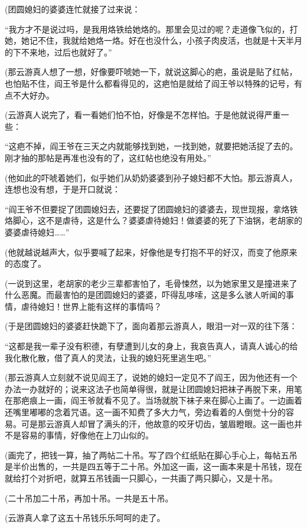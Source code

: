 \par (团圆媳妇的婆婆连忙就接了过来说：
\par “我方才不是说过吗，是我用烙铁给她烙的。那里会见过的呢？走道像飞似的，打她，她记不住，我就给她烙一烙。好在也没什么，小孩子肉皮活，也就是十天半月的下不来地，过后也就好了。”
\par (那云游真人想了一想，好像要吓唬她一下，就说这脚心的疤，虽说是贴了红帖，也怕贴不住，阎王爷是什么都看得见的，这疤怕是就给了阎王爷以特殊的记号，有点不大好办。
\par (云游真人说完了，看一看她们怕不怕，好像是不怎样怕。于是他就说得严重一些：
\par “这疤不掉，阎王爷在三天之内就能够找到她，一找到她，就要把她活捉了去的。刚才抽的那帖是再准也没有的了，这红帖也绝没有用处。”
\par (他如此的吓唬着她们，似乎她们从奶奶婆婆到孙子媳妇都不大怕。那云游真人，连想也没有想，于是开口就说：
\par “阎王爷不但要捉了团圆媳妇去，还要捉了团圆媳妇的婆婆去，现世现报，拿烙铁烙脚心，这不是虐待，这是什么？婆婆虐待媳妇！做婆婆的死了下油锅，老胡家的婆婆虐待媳妇……”
\par (他就越说越声大，似乎要喊了起来，好像他是专打抱不平的好汉，而变了他原来的态度了。
\par (一说到这里，老胡家的老少三辈都害怕了，毛骨悚然，以为她家里又是撞进来了什么恶魔。而最害怕的是团圆媳妇的婆婆，吓得乱哆嗦，这是多么骇人听闻的事情，虐待媳妇！世界上能有这样的事情吗？
\par (于是团圆媳妇的婆婆赶快跪下了，面向着那云游真人，眼泪一对一双的往下落：
\par “这都是我一辈子没有积德，有孽遭到儿女的身上，我哀告真人，请真人诚心的给我化散化散，借了真人的灵法，让我的媳妇死里逃生吧。”
\par (那云游真人立刻就不说见阎王了，说她的媳妇一定见不了阎王，因为他还有一个办法一办就好的；说来这法子也简单得很，就是让团圆媳妇把袜子再脱下来，用笔在那疤痕上一画，阎王爷就看不见了。当场就脱下袜子来在脚心上画了。一边画着还嘴里嘟嘟的念着咒语。这一画不知费了多大力气，旁边看着的人倒觉十分的容易。可是那云游真人却冒了满头的汗，他故意的咬牙切齿，皱眉瞪眼。这一画也并不是容易的事情，好像他在上刀山似的。
\par (画完了，把钱一算，抽了两帖二十吊。写了四个红纸贴在脚心手心上，每帖五吊是半价出售的，一共是四五等于二十吊。外加这一画，这一画本来是十吊钱，现在就给打个对折吧，就算五吊钱画一只脚心，一共画了两只脚心，又是十吊。
\par (二十吊加二十吊，再加十吊。一共是五十吊。
\par (云游真人拿了这五十吊钱乐乐呵呵的走了。

